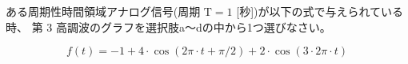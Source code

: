 ある周期性時間領域アナログ信号(周期 $\textrm{T} = 1$ [秒])が以下の式で与えられている時、
第 3 高調波のグラフを選択肢a〜dの中から1つ選びなさい。

\[
f(t) = 
-1
+ 4 \cdot \cos( 2 \pi \cdot t + \pi/2)
+ 2 \cdot \cos( 3 \cdot 2 \pi \cdot t )
\]
